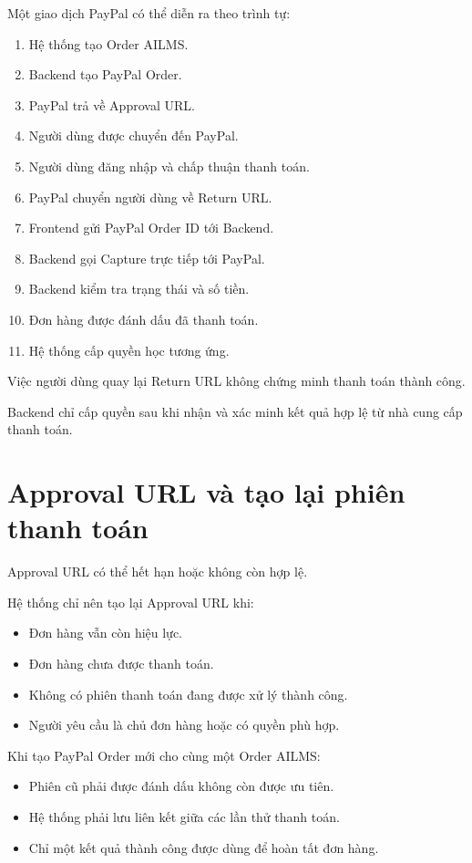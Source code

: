 \documentclass[12pt,a4paper]{article}
\begin{document}
Một giao dịch PayPal có thể diễn ra theo trình tự:

\begin{enumerate}
    \item Hệ thống tạo Order AILMS.
    \item Backend tạo PayPal Order.
    \item PayPal trả về Approval URL.
    \item Người dùng được chuyển đến PayPal.
    \item Người dùng đăng nhập và chấp thuận thanh toán.
    \item PayPal chuyển người dùng về Return URL.
    \item Frontend gửi PayPal Order ID tới Backend.
    \item Backend gọi Capture trực tiếp tới PayPal.
    \item Backend kiểm tra trạng thái và số tiền.
    \item Đơn hàng được đánh dấu đã thanh toán.
    \item Hệ thống cấp quyền học tương ứng.
\end{enumerate}

Việc người dùng quay lại Return URL không chứng minh thanh toán thành công.

Backend chỉ cấp quyền sau khi nhận và xác minh kết quả hợp lệ
từ nhà cung cấp thanh toán.

\section{Approval URL và tạo lại phiên thanh toán}

Approval URL có thể hết hạn hoặc không còn hợp lệ.

Hệ thống chỉ nên tạo lại Approval URL khi:

\begin{itemize}
    \item Đơn hàng vẫn còn hiệu lực.
    \item Đơn hàng chưa được thanh toán.
    \item Không có phiên thanh toán đang được xử lý thành công.
    \item Người yêu cầu là chủ đơn hàng hoặc có quyền phù hợp.
\end{itemize}

Khi tạo PayPal Order mới cho cùng một Order AILMS:

\begin{itemize}
    \item Phiên cũ phải được đánh dấu không còn được ưu tiên.
    \item Hệ thống phải lưu liên kết giữa các lần thử thanh toán.
    \item Chỉ một kết quả thành công được dùng để hoàn tất đơn hàng.
\end{itemize}
\end{document}

